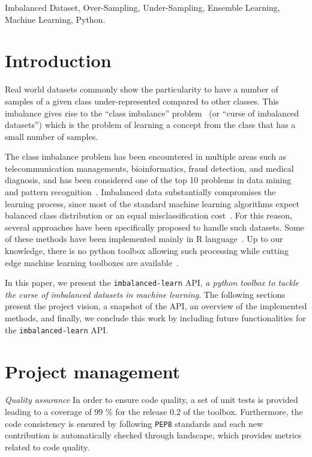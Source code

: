 \documentclass[twoside,11pt]{article}
\begin{document}
\begin{keywords}
  Imbalanced Dataset, Over-Sampling, Under-Sampling, Ensemble Learning, Machine Learning, Python.
\end{keywords}

\section{Introduction}

Real world datasets commonly show the particularity to have a number of samples of a given class under-represented compared to other classes.
This imbalance gives rise to the ``class imbalance'' problem~\citep{prati2009data} (or ``curse of imbalanced datasets'')
which is the problem of learning a concept from the class that has a small number of samples.

The class imbalance problem has been encountered in multiple areas such as
telecommunication managements, bioinformatics, fraud detection, and medical diagnosis,
and has been considered one of the top 10 problems in data mining and
pattern recognition~\citep{yang200610,rastgoo2016tackling}.
Imbalanced data substantially compromises the learning process, since most of the
standard machine learning algorithms expect balanced class distribution or an
equal misclassification cost~\citep{he2009learning}. For this reason, several
approaches have been specifically proposed to handle such datasets.
Some of these methods have been implemented mainly in R language~\citep{torgo2010data,kuhn2015caret,dal2013racing}.
Up to our knowledge, there is no python toolbox allowing such processing while cutting edge machine learning toolboxes are available~\citep{pedregosa2011scikit,sonnenburg2010shogun}.

In this paper, we present the \texttt{imbalanced-learn} API,
\textit{a python toolbox to tackle the curse of imbalanced datasets
  in machine learning}. The following sections present the project vision, a snapshot of the API, an overview of the implemented methods,
and finally, we conclude this work by including future functionalities
for the \texttt{imbalanced-learn} API.

\section{Project management}

\noindent\textit{Quality assurance} In order to ensure code quality, a set of unit tests is provided leading to a coverage of 99 \% for the release 0.2 of the toolbox.
Furthermore, the code consistency is ensured by following \texttt{PEP8} standards and each new contribution is automatically checked through landscape, which provides metrics related to code quality.
\end{document}
